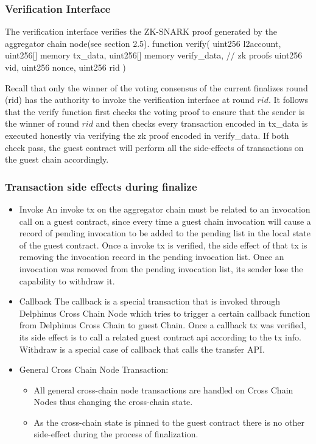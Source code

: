 \documentclass[pageno]{jpaper}
\newenvironment{code}%
   {\snugshade\verbatim}%
   {\endverbatim\endsnugshade}
\begin{document}
\subsubsection{Verification Interface}
The verification interface verifies the ZK-SNARK proof generated by the aggregator chain node(see section 2.5).
\begin{code}
function verify(
  uint256 l2account,
  uint256[] memory tx_data,
  uint256[] memory verify_data, // zk proofs 
  uint256 vid,
  uint256 nonce,
  uint256 rid
)
\end{code}

Recall that only the winner of the voting consensus of the current finalizes round (rid) has the authority to invoke the verification interface at round $rid$. It follows that the verify function first checks the voting proof to ensure that the sender is the winner of round $rid$ and then checks every transaction encoded in tx\_data is executed honestly via verifying the zk proof encoded in verify\_data. If both check pass, the guest contract will perform all the side-effects of transactions on the guest chain accordingly.\\

\subsubsection{Transaction side effects during finalize}
\begin{itemize}[leftmargin=*]
\item Invoke
    An invoke tx on the aggregator chain must be related to an invocation call on a guest contract, since every time a guest chain invocation will cause a record of pending invocation to be added to the pending list in the local state of the guest contract.
    Once a invoke tx is verified, the side effect of that tx is removing the invocation record in the pending invocation list.
    Once an invocation was removed from the pending invocation list, its sender lose the capability to withdraw it.

\item Callback
    The callback is a special transaction that is invoked through Delphinus Cross Chain Node which tries to trigger a certain callback function from Delphinus Cross Chain to guest Chain.
    Once a callback tx was verified, its side effect is to call a related guest contract api according to the tx info.
    Withdraw is a special case of callback that calls the transfer API.

\item General Cross Chain Node Transaction:
    \begin{itemize}
    \item All general cross-chain node transactions are handled on Cross Chain Nodes thus changing the cross-chain state.
    \item As the cross-chain state is pinned to the guest contract there is no other side-effect during the process of finalization.
    \end{itemize}
\end{itemize}
\end{document}
